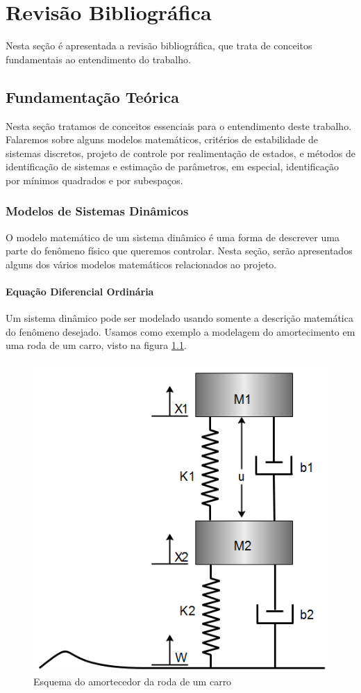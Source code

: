 \chapter{Revisão Bibliográfica} \label{cap2}

Nesta seção é apresentada a revisão bibliográfica, que trata de conceitos fundamentais ao entendimento do trabalho.
	
\section{Fundamentação Teórica}
Nesta seção tratamos de conceitos essenciais para o entendimento deste trabalho. Falaremos sobre alguns modelos matemáticos, critérios de estabilidade de sistemas discretos, projeto de controle por realimentação de estados, e métodos de identificação de sistemas e estimação de parâmetros, em especial, identificação por mínimos quadrados e por subespaços.


\subsection{Modelos de Sistemas Dinâmicos}\label{capA}
O modelo matemático de um sistema dinâmico é uma forma de descrever uma parte do fenômeno físico que queremos controlar. Nesta seção, serão apresentados alguns dos vários modelos matemáticos relacionados ao projeto.
\subsubsection{Equação Diferencial Ordinária}
Um sistema dinâmico pode ser modelado usando somente a descrição matemática do fenômeno desejado. Usamos como exemplo a modelagem do amortecimento em uma roda de um carro, visto na figura \ref{fig:modeloamortecimento}.

\begin{figure}
	\centering
	\includegraphics[width=0.5\linewidth]{modelo_amortecimento}
	\caption{Esquema do amortecedor da roda de um carro}
	\label{fig:modeloamortecimento}
\end{figure}

